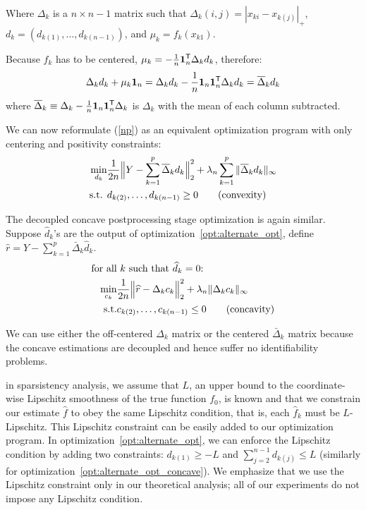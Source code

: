 Where $\Delta_k$ is a $n\times n-1$ matrix such that $\Delta_k(i,j) = |x_{ki} - x_{k(j)}|_+$, $d_k = (d_{k(1)} ,..., d_{k(n-1)})$, and $\mu_k = f_k(x_{k1})$. 

Because $f_k$ has to be centered, $\mu_k = - \frac{1}{n} \mbox{\boldmath $1$}_n^{\mathsf{T}} \Delta_k d_k$, therefore:
\[
\Delta_k d_k + \mu_k \mbox{\boldmath $1$}_n = 
   \Delta_k d_k - \frac{1}{n} \mbox{\boldmath $1$}_n \mbox{\boldmath $1$}_n^{\mathsf{T}} \Delta_k d_k = 
   \overline{\Delta}_k d_k 
\]
where $\overline{\Delta}_k \equiv \Delta_k - \frac{1}{n} \mbox{\boldmath $1$}_n \mbox{\boldmath $1$}_n^{\mathsf{T}} \Delta_k$ is $\Delta_k$ with the mean of each column subtracted.

We can now reformulate (\ref{np}) as an equivalent optimization program with only centering and positivity constraints:
\begin{align}
\min_{d_k}& \frac{1}{2n} 
       \Bigl\| Y - \sum_{k=1}^p 
              \overline{\Delta}_k d_k \Bigr\|_2^2 
               + \lambda_n \sum_{k=1}^p \|\overline{\Delta}_k d_k \|_\infty   
     \label{opt:alternate_opt} \\
\textrm{s.t. }  & d_{k(2)}, \ldots , d_{k(n-1)} \geq 0  	
               \qquad \textrm{(convexity)} \nonumber 
\end{align}

The decoupled concave postprocessing stage optimization is again similar. Suppose $\hat{d}_k$'s are the output of optimization~\ref{opt:alternate_opt}, define $\hat{r} = Y - \sum_{k=1}^p \bar{\Delta}_k \hat{d}_k$. 
\begin{align}
\textrm{for all}&\textrm{ $k$ such that $\widehat{d}_k = 0$: }  \nonumber \\
  \min_{c_k} & 
      \frac{1}{2n} \Bigl \| \widehat{r} - \Delta_k c_k \Bigr \|_2^2
      + \lambda_n \| \Delta_k c_k \|_\infty 
      \label{opt:alternate_opt_concave}\\
 \textrm{s.t.} & c_{k(2)}, \ldots, c_{k(n-1)} \leq 0 \qquad \textrm{(concavity)} \nonumber
\end{align}

We can use either the off-centered $\Delta_k$ matrix or the centered $\bar{\Delta}_k$ matrix because the concave estimations are decoupled and hence suffer no identifiability problems.\\

\begin{remark}
in sparsistency analysis, we assume that $L$, an upper bound to the coordinate-wise Lipschitz smoothness of the true function $f_0$, is known and that we constrain our estimate $\hat{f}$ to obey the same Lipschitz condition, that is, each $\hat{f}_k$ must be $L$-Lipschitz. This Lipschitz constraint can be easily added to our optimization program. In optimization~\ref{opt:alternate_opt}, we can enforce the Lipschitz condition by adding two constraints: $d_{k(1)} \geq - L$ and $\sum_{j=2}^{n-1} d_{k(j)} \leq L$ (similarly for optimization~\ref{opt:alternate_opt_concave}). We emphasize that we use the Lipschitz constraint only in our theoretical analysis; all of our experiments do not impose any Lipschitz condition.
\end{remark}



